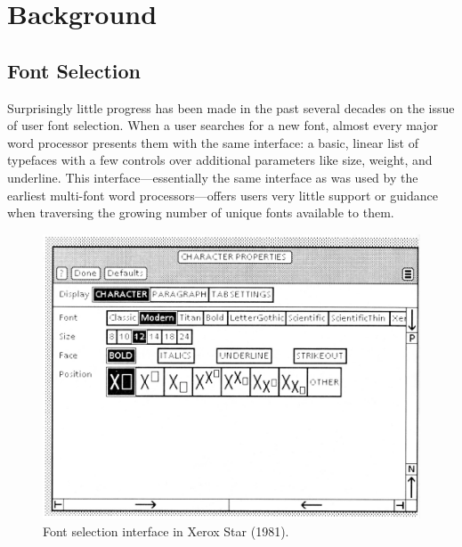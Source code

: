 \chapter{Background}
\label{chap:background}

\section{Font Selection}

Surprisingly little progress has been made in the past several decades on the issue of user font selection. When a user searches for a new font, almost every major word processor presents them with the same interface: a basic, linear list of typefaces with a few controls over additional parameters like size, weight, and underline. This interface—essentially the same interface as was used by the earliest multi-font word processors—offers users very little support or guidance when traversing the growing number of unique fonts available to them.

\begin{figure}[h]
    \centering
    \includegraphics[width=.8\textwidth]{images/xerox-star.png}
    \caption{Font selection interface in Xerox Star (1981).}
    \label{fig:xerox-star}
\end{figure}

